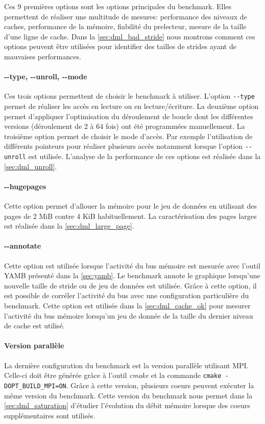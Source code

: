         Ces 9 premières options sont les options principales du benchmark. Elles permettent de réaliser une multitude de mesures: performance des niveaux de caches, performance de la mémoire, fiabilité du \gls{prelecteur}, mesure de la taille d'une ligne de cache. Dans la \autoref{sec:dml_bad_stride} nous montrons comment ces options peuvent être utilisées pour identifier des tailles de strides ayant de mauvaises performances.
    
    
        \paragraph{-{}-type, -{}-unroll, -{}-mode} Ces trois options permettent de choisir le benchmark à utiliser. L'option \verb|--type| permet de réaliser les accès en lecture ou en lecture/écriture. La deuxième option permet d'appliquer l'optimisation du déroulement de boucle dont les différentes versions (déroulement de 2 à 64 fois) ont été programmées manuellement. La troisième option permet de choisir le mode d'accès. Par exemple l'utilisation de différents pointeurs pour réaliser plusieurs accès notamment lorsque l'option \verb|--unroll| est utilisée. L'analyse de la performance de ces options est réalisée dans la \autoref{sec:dml_unroll}.

        \paragraph{-{}-hugepages} Cette option permet d'allouer la mémoire pour le jeu de données en utilisant des pages de 2 MiB contre 4 KiB habituellement. La caractérisation des pages larges est réalisée dans la \autoref{sec:dml_large_page}.
        
        \paragraph{-{}-annotate} Cette option est utilisée lorsque l'activité du bus mémoire est mesurée avec l'outil YAMB présenté dans la \autoref{sec:yamb}. Le benchmark annote le graphique lorsqu'une nouvelle taille de stride ou de jeu de données est utilisée. Grâce à cette option, il est possible de corréler l'activité du bus avec une configuration particulière du benchmark. Cette option est utilisée dans la \autoref{sec:dml_cache_ok} pour mesurer l'activité du bus mémoire lorsqu'un jeu de donnée de la taille du dernier niveau de cache est utilisé. 

        \paragraph{Version parallèle} La dernière configuration du benchmark est la version parallèle utilisant MPI. Celle-ci doit être générée grâce à l'outil \textit{cmake} et la commande \verb|cmake -DOPT_BUILD_MPI=ON|. Grâce à cette version, plusieurs coeurs peuvent exécuter la même version du benchmark. Cette version du benchmark nous permet dans la \autoref{sec:dml_saturation} d'étudier l'évolution du débit mémoire lorsque des coeurs supplémentaires sont utilisés.
        

